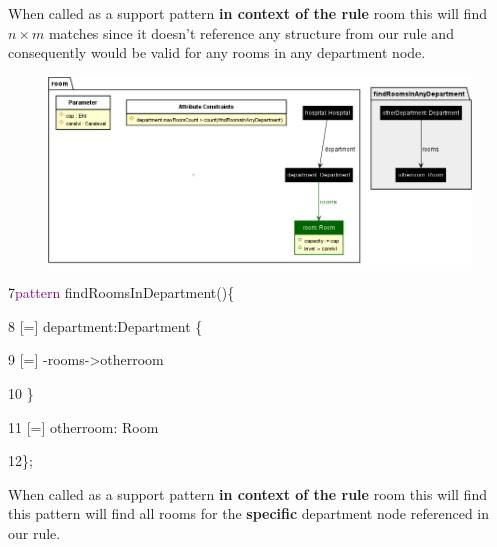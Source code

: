 When called as a support pattern \textbf{in context of the rule} \textsf{room} this will find $n \times m$ matches since it doesn't reference any structure from our rule and consequently would be valid for any rooms in any department node.\newline

\begin{figure}[h]
    \centering
    \includegraphics[scale=0.45]{pictures/findRoomsInAnyDepartment.png}
    \caption{}
    \label{findRoomsAny}
\end{figure}

\clearpage


{

7\hspace{1cm}\textcolor{Purple}{pattern} findRoomsInDepartment()\{  

8\hspace{1.5cm} [=] department:Department \{

9\hspace{2cm} [=] -rooms->otherroom 

10\hspace{1.5cm} \} 

11\hspace{1.5cm} [=] otherroom: Room 

12\hspace{1cm}\};\newline 

}

When called as a support pattern \textbf{in context of the rule} \textsf{room} this will find this pattern will find all rooms for the \textbf{specific} department node referenced in our rule.

